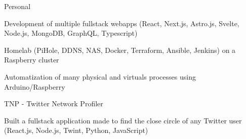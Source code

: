 
\begin{cventries}
  \cventry
    {} %
    {Personal} %
    {} %
    {} %
    {
      \begin{cvitems} %
        \item {Development of multiple fullstack webapps (React, Next.js, Astro.js, Svelte, Node.js, MongoDB, GraphQL, Typescript)}
        \item {Homelab (PiHole, DDNS, NAS, Docker, Terraform, Ansible, Jenkins) on a Raspberry cluster}
		\item {Automatization of many physical and virtuals processes using Arduino/Raspberry}
      \end{cvitems}
    }

  \cventry
    {} %
    {TNP - Twitter Network Profiler} %
    {} %
    {} %
    {
      \vspace{-4.0mm}
      \begin{cvitems} %
        \vspace{-4.0mm}
      	\item {Built a fullstack application made to find the close circle of any Twitter user (React.js, Node.js, Twint, Python, JavaScript)}
      \end{cvitems}
      \vspace{-4.0mm}
    }
\end{cventries}